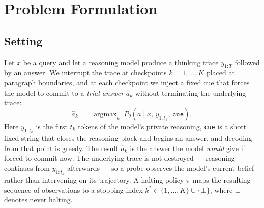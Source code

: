 \documentclass[acmsmall]{acmart}
\theoremstyle{acmdefinition}%
\theoremstyle{acmplain}}{}%
\begin{document}
\section{Problem Formulation}\label{sec:formulation}

\subsection{Setting}
Let $x$ be a query and let a reasoning model produce a thinking trace $y_{1:T}$ followed by an answer. We interrupt the trace at checkpoints $k=1,\dots,K$ placed at paragraph boundaries, and at each checkpoint we inject a fixed cue that forces the model to commit to a \emph{trial answer} $\hat a_k$ without terminating the underlying trace:
\begin{equation}
\hat a_k \;=\; \operatorname{argmax}_{a}\; P_\theta\!\left(a \mid x,\, y_{1:t_k},\, \texttt{cue}\right),
\label{eq:probe}
\end{equation}
Here $y_{1:t_k}$ is the first $t_k$ tokens of the model's private reasoning, \texttt{cue} is a short fixed string that closes the reasoning block and begins an answer, and decoding from that point is greedy. The result $\hat a_k$ is the answer the model \emph{would} give if forced to commit now. The underlying trace is not destroyed --- reasoning continues from $y_{1:t_k}$ afterwards --- so a probe observes the model's current belief rather than intervening on its trajectory. A halting policy $\pi$ maps the resulting sequence of observations to a stopping index $k^\ast \in \{1,\dots,K\}\cup\{\bot\}$, where $\bot$ denotes never halting.
\end{document}
